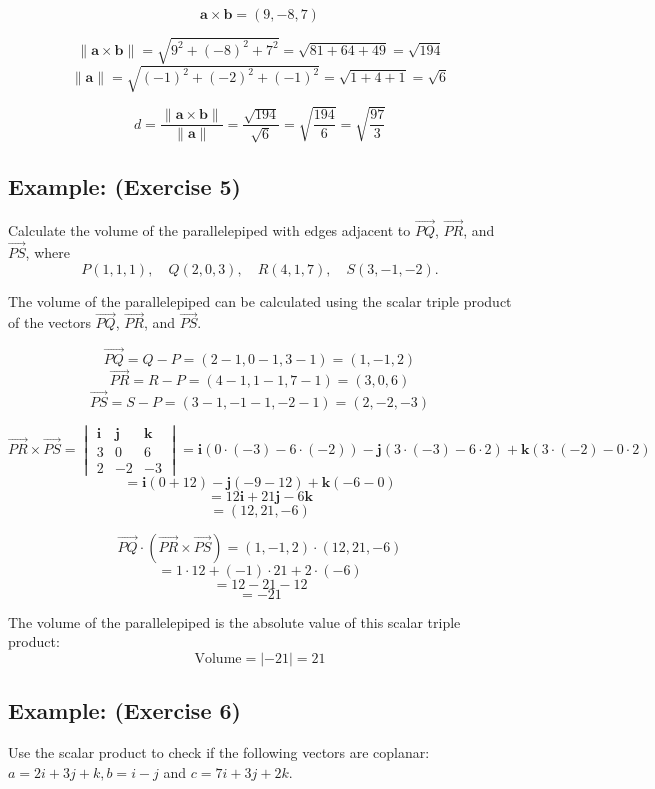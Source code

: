 \documentclass[11pt]{article}
\begin{document}
\[
\mathbf{a} \times \mathbf{b} = (9, -8, 7)
\]

\[
\|\mathbf{a} \times \mathbf{b}\| = \sqrt{9^2 + (-8)^2 + 7^2}
= \sqrt{81 + 64 + 49} = \sqrt{194}
\]
\[
\|\mathbf{a}\| = \sqrt{(-1)^2 + (-2)^2 + (-1)^2} = \sqrt{1 + 4 + 1} = \sqrt{6}
\]

\[
d = \frac{\|\mathbf{a} \times \mathbf{b}\|}{\|\mathbf{a}\|} = \frac{\sqrt{194}}{\sqrt{6}}
= \sqrt{\frac{194}{6}} = \sqrt{\frac{97}{3}}
\]

\subsection*{Example: (Exercise 5)}
Calculate the volume of the parallelepiped with edges adjacent to $\overrightarrow{PQ}$, $\overrightarrow{PR}$, and $\overrightarrow{PS}$,
where
\[
P(1, 1, 1), \quad Q(2, 0, 3), \quad R(4, 1, 7), \quad S(3, -1, -2).
\]

The volume of the parallelepiped can be calculated using the scalar triple product of the vectors $\overrightarrow{PQ}$, $\overrightarrow{PR}$, and $\overrightarrow{PS}$.

\[
\overrightarrow{PQ} = Q - P = (2 - 1, 0 - 1, 3 - 1) = (1, -1, 2)
\]
\[
\overrightarrow{PR} = R - P = (4 - 1, 1 - 1, 7 - 1) = (3, 0, 6)
\]
\[
\overrightarrow{PS} = S - P = (3 - 1, -1 - 1, -2 - 1) = (2, -2, -3)
\]

\[
\overrightarrow{PR} \times \overrightarrow{PS} = \begin{vmatrix}
\mathbf{i} & \mathbf{j} & \mathbf{k} \\
3 & 0 & 6 \\
2 & -2 & -3
\end{vmatrix}
= \mathbf{i}(0 \cdot (-3) - 6 \cdot (-2)) - \mathbf{j}(3 \cdot (-3) - 6 \cdot 2) + \mathbf{k}(3 \cdot (-2) - 0 \cdot 2)
\]
\[
= \mathbf{i}(0 + 12) - \mathbf{j}(-9 - 12) + \mathbf{k}(-6 - 0)
\]
\[
= 12\mathbf{i} + 21\mathbf{j} - 6\mathbf{k}
\]
\[
= (12, 21, -6)
\]

\[
\overrightarrow{PQ} \cdot (\overrightarrow{PR} \times \overrightarrow{PS}) = (1, -1, 2) \cdot (12, 21, -6)
\]
\[
= 1 \cdot 12 + (-1) \cdot 21 + 2 \cdot (-6)
\]
\[
= 12 - 21 - 12
\]
\[
= -21
\]

The volume of the parallelepiped is the absolute value of this scalar triple product:
\[
\text{Volume} = | -21 | = 21
\]

\subsection*{Example: (Exercise 6)}
Use the scalar product to check if the following vectors are coplanar:
$a = 2i + 3j + k, b = i - j$ and $c = 7i + 3j + 2k$.
\end{document}
